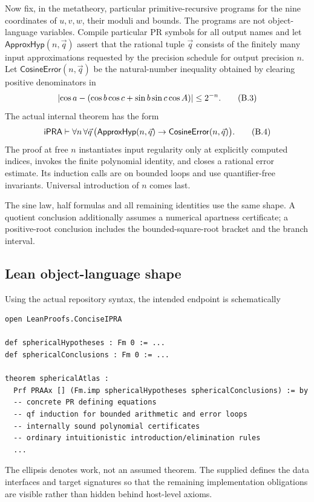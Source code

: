 Now fix, in the metatheory, particular primitive-recursive programs for the
nine coordinates of \(u,v,w\), their moduli and bounds.  The programs are not
object-language variables.  Compile particular PR symbols for all output names
and let \(\mathsf{ApproxHyp}(n,\vec q)\) assert that the rational tuple
\(\vec q\) consists of the finitely many input approximations requested by the
precision schedule for output precision \(n\).  Let
\(\mathsf{CosineError}(n,\vec q)\) be the natural-number inequality obtained
by clearing positive denominators in
\begin{equation}
 \left|\cos a-
 (\cos b\cos c+\sin b\sin c\cos A)\right|\le2^{-n}.              \tag{B.3}
\end{equation}
The actual internal theorem has the form
\begin{equation}
 \mathsf{iPRA}\vdash
 \forall n\,\forall\vec q\,
 \bigl(\mathsf{ApproxHyp}(n,\vec q)
 \to\mathsf{CosineError}(n,\vec q)\bigr).                  \tag{B.4}
\end{equation}
The proof at free \(n\) instantiates input regularity only at explicitly
computed indices, invokes the finite polynomial identity, and closes a rational
error estimate.  Its induction calls are on bounded loops and use
quantifier-free invariants.  Universal introduction of \(n\) comes last.

The sine law, half formulas and all remaining identities use the same shape.
A quotient conclusion additionally assumes a numerical apartness certificate;
a positive-root conclusion includes the bounded-square-root bracket and the
branch interval.

\subsection{Lean object-language shape}

Using the actual repository syntax, the intended endpoint is schematically
\begin{lstlisting}[language={}]
open LeanProofs.ConciseIPRA

def sphericalHypotheses : Fm 0 := ...
def sphericalConclusions : Fm 0 := ...

theorem sphericalAtlas :
  Prf PRAAx [] (Fm.imp sphericalHypotheses sphericalConclusions) := by
  -- concrete PR defining equations
  -- qf induction for bounded arithmetic and error loops
  -- internally sound polynomial certificates
  -- ordinary intuitionistic introduction/elimination rules
  ...
\end{lstlisting}
The ellipsis denotes work, not an assumed theorem.  The supplied
 defines the data interfaces and target signatures so
that the remaining implementation obligations are visible rather than hidden
behind host-level axioms.

